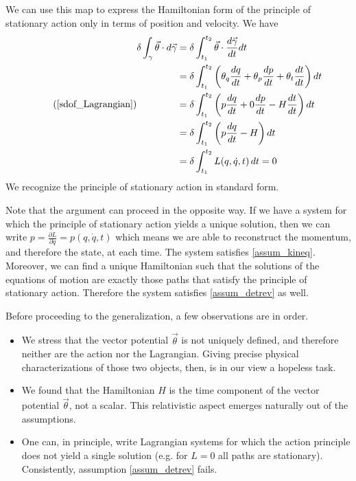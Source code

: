 \documentclass[10pt,twocolumn, nofootinbib]{revtex4-2}
\begin{document}
We can use this map to express the Hamiltonian form of the principle of stationary action only in terms of position and velocity. We have
\begin{equation}
\tag*{(\ref{sdof_Lagrangian})}
	\begin{aligned}
		\delta \int_\gamma \vec{\theta} \cdot d\vec{\gamma} &= \delta \int^{t_2}_{t_1} \vec{\theta} \cdot \frac{d\vec{\gamma}}{dt} dt \\
		&= \delta \int^{t_2}_{t_1} \left(\theta_q \frac{dq}{dt} + \theta_p \frac{dp}{dt} + \theta_t \frac{dt}{dt}\right) dt \\
		&= \delta\int^{t_2}_{t_1} \left(p \frac{dq}{dt} + 0 \frac{dp}{dt} - H \frac{dt}{dt}\right) dt \\
		&= \delta \int^{t_2}_{t_1} \left(p \frac{dq}{dt} - H\right) dt \\
		&= \delta \int^{t_2}_{t_1} L(q, \dot{q}, t) \, dt = 0
	\end{aligned}
\end{equation}
We recognize the principle of stationary action in standard form.

Note that the argument can proceed in the opposite way. If we have a system for which the principle of stationary action yields a unique solution, then we can write $p=\frac{\partial L}{\partial \dot{q}} = p(q, \dot{q}, t)$ which means we are able to reconstruct the momentum, and therefore the state, at each time. The system satisfies \ref{assum_kineq}. Moreover, we can find a unique Hamiltonian such that the solutions of the equations of motion are exactly those paths that satisfy the principle of stationary action. Therefore the system satisfies \ref{assum_detrev} as well.

Before proceeding to the generalization, a few observations are in order.
\begin{itemize}
	\item We stress that the vector potential $\vec{\theta}$ is not uniquely defined, and therefore neither are the action nor the Lagrangian. Giving precise physical characterizations of those two objects, then, is in our view a hopeless task.
	\item We found that the Hamiltonian $H$ is the time component of the vector potential $\vec{\theta}$, not a scalar. This relativistic aspect emerges naturally out of the assumptions.
	\item One can, in principle, write Lagrangian systems for which the action principle does not yield a single solution (e.g. for $L=0$ all paths are stationary). Consistently, assumption \ref{assum_detrev} fails.
\end{itemize}
\end{document}
